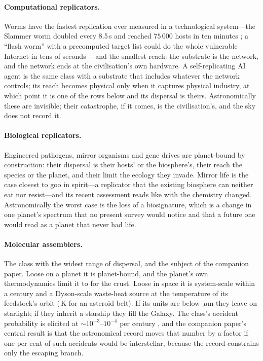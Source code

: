 \documentclass[11pt]{article}
\newcommand{\um}{\ensuremath{\,\mu\mathrm{m}}\xspace}
\begin{document}
\paragraph{Computational replicators.}  Worms have the fastest replication
ever measured in a technological system---the Slammer worm doubled every
8.5\,s and reached $75\,000$ hosts in ten minutes \citep{Moore2003}; a
``flash worm'' with a precomputed target list could do the whole vulnerable
Internet in tens of seconds \citep{Staniford2002}---and the smallest reach:
the substrate is the network, and the network ends at the civilisation's own
hardware.  A self-replicating AI agent \citep{Pan2024} is the same class with
a substrate that includes whatever the network controls; its reach becomes
physical only when it captures physical industry, at which point it is one of
the rows below and its dispersal is theirs.  Astronomically these are
invisible; their catastrophe, if it comes, is the civilisation's, and the sky
does not record it.

\paragraph{Biological replicators.}  Engineered pathogens, mirror organisms
and gene drives are planet-bound by construction: their dispersal is their
hosts' or the biosphere's, their reach the species or the planet, and their
limit the ecology they invade.  Mirror life is the case closest to goo in
spirit---a replicator that the existing biosphere can neither eat nor
resist---and its recent assessment \citep{Adamala2024} reads like
\citet{Freitas2000} with the chemistry changed.  Astronomically the worst case
is the loss of a biosignature, which is a change in one planet's spectrum
that no present survey would notice and that a future one would read as a
planet that never had life.

\paragraph{Molecular assemblers.}  The class with the widest range of
dispersal, and the subject of the companion paper.  Loose on a planet it is
planet-bound, and the planet's own thermodynamics limit it to \CrustGovTime
for the crust.  Loose in space it is system-scale within a century and a
Dyson-scale waste-heat source at the temperature of its feedstock's orbit
(\BeltTempK\,K for an asteroid belt).  If its units are below
\BlowoutRadiusUm\um they leave on starlight; if they inherit a starship they
fill the Galaxy.  The class's accident probability is elicited at
$\sim10^{-3}$--$10^{-4}$ per century \citep{Sandberg2008}, and the companion
paper's central result is that the astronomical record moves that number by
a factor \BranchRatioTypical if one per cent of such accidents would be
interstellar, because the record constrains only the escaping branch.
\end{document}
